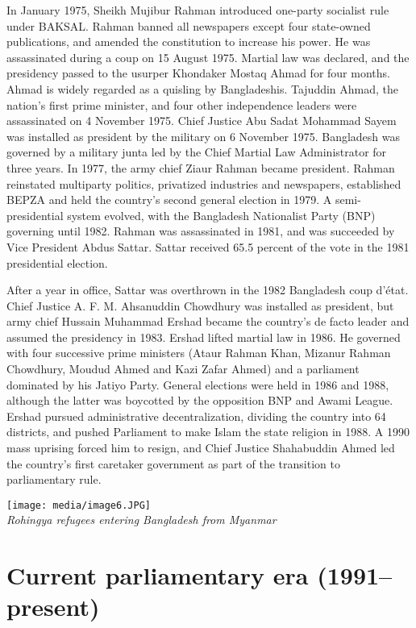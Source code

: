 In January 1975, Sheikh Mujibur Rahman introduced one-party socialist
rule under BAKSAL. Rahman banned all newspapers except four state-owned
publications, and amended the constitution to increase his power. He was
assassinated during a coup on 15 August 1975. Martial law was declared,
and the presidency passed to the usurper Khondaker Mostaq Ahmad for four
months. Ahmad is widely regarded as a quisling by Bangladeshis. Tajuddin
Ahmad, the nation's first prime minister, and four other independence
leaders were assassinated on 4 November 1975. Chief Justice Abu Sadat
Mohammad Sayem was installed as president by the military on 6 November
1975. Bangladesh was governed by a military junta led by the Chief
Martial Law Administrator for three years. In 1977, the army chief Ziaur
Rahman became president. Rahman reinstated multiparty politics,
privatized industries and newspapers, established BEPZA and held the
country's second general election in 1979. A semi-presidential system
evolved, with the Bangladesh Nationalist Party (BNP) governing until
1982. Rahman was assassinated in 1981, and was succeeded by Vice
President Abdus Sattar. Sattar received 65.5 percent of the vote in the
1981 presidential election.

After a year in office, Sattar was overthrown in the 1982 Bangladesh
coup d'état. Chief Justice A. F. M. Ahsanuddin Chowdhury was installed
as president, but army chief Hussain Muhammad Ershad became the
country's de facto leader and assumed the presidency in 1983. Ershad
lifted martial law in 1986. He governed with four successive prime
ministers (Ataur Rahman Khan, Mizanur Rahman Chowdhury, Moudud Ahmed and
Kazi Zafar Ahmed) and a parliament dominated by his Jatiyo Party.
General elections were held in 1986 and 1988, although the latter was
boycotted by the opposition BNP and Awami League. Ershad pursued
administrative decentralization, dividing the country into 64 districts,
and pushed Parliament to make Islam the state religion in 1988. A 1990
mass uprising forced him to resign, and Chief Justice Shahabuddin Ahmed
led the country's first caretaker government as part of the transition
to parliamentary rule.

\texttt{[image: media/image6.JPG]}\\
\emph{Rohingya refugees entering Bangladesh from Myanmar}

\section{Current parliamentary era
(1991--present)}\label{current-parliamentary-era-1991present}

